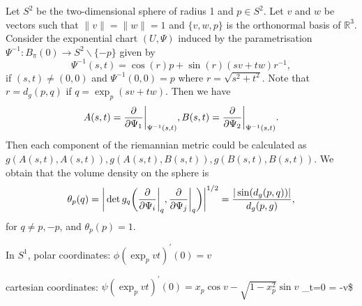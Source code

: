 \documentclass[11pt,a4paper,]{article}
\begin{document}
Let \(S^2\) be the two-dimensional sphere of radius 1 and \(p \in S^2\). Let
\(v\) and \(w\) be vectors such that \(\|v\| = \|w\| = 1\) and \(\{v, w, p\}\)
is the orthonormal basis of \(\mathbb{R}^3\). Consider the exponential
chart \((U, \Psi)\) induced by the parametrisation
\(\Psi^{-1}: B_\pi(0) \rightarrow S^2 \backslash \{-p\}\) given by \[
\Psi^{-1}(s,t) = \cos(r)p + \sin(r)(sv+tw)r^{-1},
\] if \((s,t) \neq (0,0)\) and \(\Psi^{-1}(0,0)=p\) where
\(r=\sqrt{s^2 + t^2}\). Note that \(r=d_g(p,q)\) if \(q = \exp_p(sv+tw)\).
Then we have \[
A(s,t) = \frac{\partial}{\partial \Psi_1} \bigg|_{\Psi^{-1}(s,t)}, \\
B(s,t) = \frac{\partial}{\partial \Psi_2} \bigg|_{\Psi^{-1}(s,t)}.
\] Then each component of the riemannian metric could be calculated as
\(g(A(s,t), A(s,t)), g(A(s,t), B(s,t)), g(B(s,t), B(s,t))\). We obtain
that the volume density on the sphere is \[
\theta_p(q) = \bigg| \det g_q\bigg( \frac{\partial}{\partial \Psi_i}\bigg|_q, \frac{\partial}{\partial \Psi_j}\bigg|_q \bigg) \bigg|^{1/2} \\
= \frac{|\sin(d_g(p,q))|}{d_g(p,g)},
\] for \(q \neq p, -p\), and \(\theta_p(p) = 1\).

In \(S^1\), polar coordinates: \(\phi(\exp_p{vt})^{\prime}(0) = v\)

cartesian coordinates:
\(\psi(\exp_p{vt})^{\prime}(0) = x_p \cos{v} - \sqrt{1-x_p^2} \sin{v}\)
\bigg\_t=0 = -v\$

\newpage

\printbibliography
\end{document}
